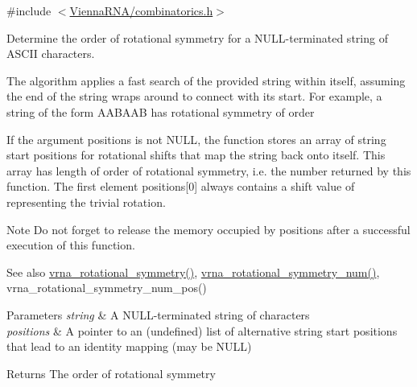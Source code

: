 {\ttfamily \#include $<$\hyperlink{combinatorics_8h}{Vienna\+R\+N\+A/combinatorics.\+h}$>$}



Determine the order of rotational symmetry for a N\+U\+L\+L-\/terminated string of A\+S\+C\+II characters. 

The algorithm applies a fast search of the provided string within itself, assuming the end of the string wraps around to connect with it\textquotesingle{}s start. For example, a string of the form {\ttfamily A\+A\+B\+A\+AB} has rotational symmetry of order {} 

If the argument {\ttfamily positions} is not {\ttfamily N\+U\+LL}, the function stores an array of string start positions for rotational shifts that map the string back onto itself. This array has length of order of rotational symmetry, i.\+e. the number returned by this function. The first element {\ttfamily positions}\mbox{[}0\mbox{]} always contains a shift value of {} representing the trivial rotation.

\begin{DoxyNote}{Note}
Do not forget to release the memory occupied by {\ttfamily positions} after a successful execution of this function.
\end{DoxyNote}
\begin{DoxySeeAlso}{See also}
\hyperlink{group__combinatorics__utils_gae1dec02c4b63f303ce06a9293d316762}{vrna\+\_\+rotational\+\_\+symmetry()}, \hyperlink{group__combinatorics__utils_gac51464b5281833a58c25f9447252c495}{vrna\+\_\+rotational\+\_\+symmetry\+\_\+num()}, vrna\+\_\+rotational\+\_\+symmetry\+\_\+num\+\_\+pos()
\end{DoxySeeAlso}

\begin{DoxyParams}{Parameters}
{\em string} & A N\+U\+L\+L-\/terminated string of characters \\
\hline
{\em positions} & A pointer to an (undefined) list of alternative string start positions that lead to an identity mapping (may be N\+U\+LL) \\
\hline
\end{DoxyParams}
\begin{DoxyReturn}{Returns}
The order of rotational symmetry 
\end{DoxyReturn}
\mbox{\label{group__combinatorics__utils_gad42ffd53025bed9d636d811748db7c5a}} 
